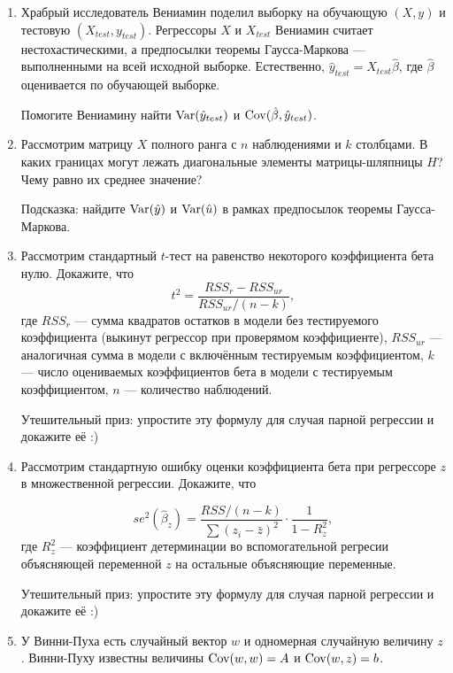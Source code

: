\begin{enumerate}
  \item Храбрый исследователь Вениамин поделил выборку на обучающую $(X, y)$ и тестовую $(X_{test}, y_{test})$.
  Регрессоры $X$ и $X_{test}$ Вениамин считает нестохастическими, а предпосылки
  теоремы Гаусса-Маркова — выполненными на всей исходной выборке. Естественно,
  $\hat y_{test} = X_{test}\hat\beta$, где $\hat\beta$ оценивается по обучающей выборке.

  Помогите Вениамину найти $\operatorname{Var}(\hat y_{test})$ и $\operatorname{Cov}(\hat \beta, \hat y_{test})$.

  \item Рассмотрим матрицу $X$ полного ранга с $n$ наблюдениями и $k$ столбцами.
  В каких границах могут лежать диагональные элементы матрицы-шляпницы $H$?
  Чему равно их среднее значение?

  Подсказка: найдите $\operatorname{Var}(\hat y)$ и $\operatorname{Var}(\hat u)$ в рамках предпосылок теоремы Гаусса-Маркова.

  \item Рассмотрим стандартный $t$-тест на равенство некоторого коэффициента бета нулю.
  Докажите, что
  \[
         t^2 = \frac{RSS_r - RSS_{ur}}{RSS_{ur}/(n-k)},
  \]
  где $RSS_r$ — сумма квадратов остатков в модели без тестируемого коэффициента
  (выкинут регрессор при проверямом коэффициенте),
  $RSS_{ur}$ — аналогичная сумма в модели с включённым тестируемым коэффициентом, $k$ —
  число оцениваемых коэффициентов бета в модели с тестируемым коэффициентом, $n$ —
  количество наблюдений.

  Утешительный приз: упростите эту формулу для случая парной регрессии и докажите её :)

  \item Рассмотрим стандартную ошибку оценки коэффициента бета при регрессоре $z$
  в множественной регрессии.
  Докажите, что

  \[
         se^2(\hat\beta_z) = \frac{RSS / (n-k)}{\sum (z_i - \bar z)^2} \cdot \frac{1}{1 - R^2_z},
  \]
  где $R^2_z$ — коэффициент детерминации во вспомогательной регресии объясняющей переменной
  $z$ на остальные объясняющие переменные.

  Утешительный приз: упростите эту формулу для случая парной регрессии и докажите её :)


   \item У Винни-Пуха есть случайный вектор $w$ и одномерная случайную величину $z$.
   Винни-Пуху известны величины $\operatorname{Cov}(w, w) = A$ и $\operatorname{Cov}(w, z) = b$.


\end{enumerate}

